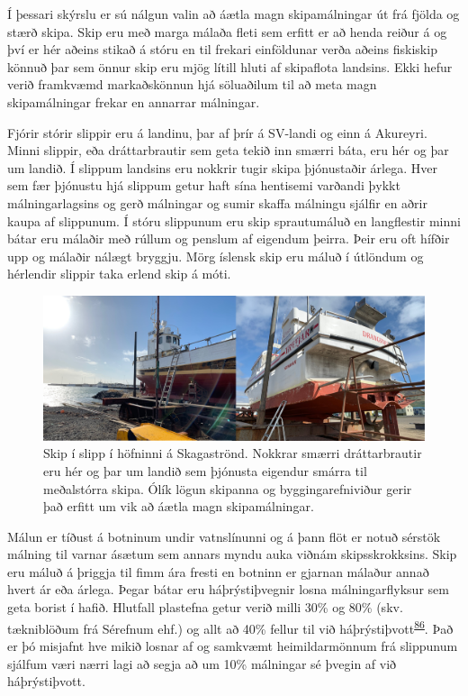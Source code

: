 \documentclass[icelandic,]{book}
\begin{document}
Í þessari skýrslu er sú nálgun valin að áætla magn skipamálningar út frá fjölda og stærð skipa. Skip eru með marga málaða fleti sem erfitt er að henda reiður á og því er hér aðeins stikað á stóru en til frekari einföldunar verða aðeins fiskiskip könnuð þar sem önnur skip eru mjög lítill hluti af skipaflota landsins. Ekki hefur verið framkvæmd markaðskönnun hjá söluaðilum til að meta magn skipamálningar frekar en annarrar málningar.

Fjórir stórir slippir eru á landinu, þar af þrír á SV-landi og einn á Akureyri. Minni slippir, eða dráttarbrautir sem geta tekið inn smærri báta, eru hér og þar um landið. Í slippum landsins eru nokkrir tugir skipa þjónustaðir árlega. Hver sem fær þjónustu hjá slippum getur haft sína hentisemi varðandi þykkt málningarlagsins og gerð málningar og sumir skaffa málningu sjálfir en aðrir kaupa af slippunum. Í stóru slippunum eru skip sprautumáluð en langflestir minni bátar eru málaðir með rúllum og penslum af eigendum þeirra. Þeir eru oft hífðir upp og málaðir nálægt bryggju. Mörg íslensk skip eru máluð í útlöndum og hérlendir slippir taka erlend skip á móti.

\begin{figure}[H]

{\centering \includegraphics[width=1\linewidth]{myndir/slippurb.jpg} 

}

\caption{Skip í slipp í höfninni á Skagaströnd. Nokkrar smærri dráttarbrautir eru hér og þar um landið sem þjónusta eigendur smárra til meðalstórra skipa. Ólík lögun skipanna og byggingarefniviður gerir það erfitt um vik að áætla magn skipamálningar.}\label{fig:Slippur}
\end{figure}

Málun er tíðust á botninum undir vatnslínunni og á þann flöt er notuð sérstök málning til varnar ásætum sem annars myndu auka viðnám skipsskrokksins. Skip eru máluð á þriggja til fimm ára fresti en botninn er gjarnan málaður annað hvert ár eða árlega. Þegar bátar eru háþrýstiþvegnir losna málningarflyksur sem geta borist í hafið. Hlutfall plastefna getur verið milli 30\% og 80\% (skv. tækniblöðum frá Sérefnum ehf.) og allt að 40\% fellur til við háþrýstiþvott\textsuperscript{\protect\hyperlink{ref-Verschoor2016}{86}}. Það er þó misjafnt hve mikið losnar af og samkvæmt heimildarmönnum frá slippunum sjálfum væri nærri lagi að segja að um 10\% málningar sé þvegin af við háþrýstiþvott.
\end{document}
